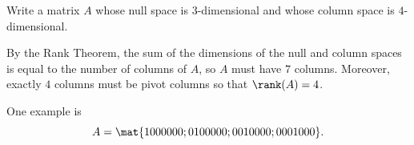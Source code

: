 \begin{problems}
\problem %
Write a matrix $A$ whose null space is $3$-dimensional and whose
column space is $4$-dimensional.

\begin{solution}
  By the Rank Theorem, the sum of the dimensions of the null and
  column spaces is equal to the number of columns of $A$, so $A$ must
  have $7$ columns.  Moreover, exactly $4$ columns must be pivot
  columns so that $\rank(A)=4$.

  One example is
\[A = \mat{1 0 0 0 0 0 0; 0 1 0 0 0 0 0; 0 0 1 0 0 0 0; 0 0 0 1 0 0 0}.\]
\end{solution}

\end{problems} \setcounter{problem}{0}


\newpage